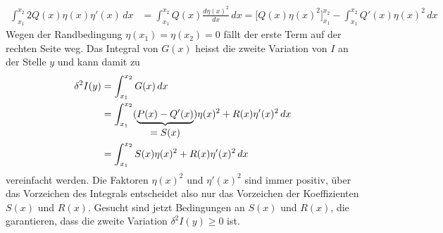 \begin{align*}
\int_{x_1}^{x_2}
2Q(x)\eta(x)\eta'(x)
\,dx
&=
\int_{x_1}^{x_2}
Q(x) \frac{d\eta(x)^2}{dx}
\,dx
=
\biggl[Q(x)\eta(x)^2\biggr]_{x_1}^{x_2}
-
\int_{x_1}^{x_2} Q'(x) \eta(x)^2\,dx
\end{align*}
Wegen der Randbedingung $\eta(x_1)=\eta(x_2)=0$ fällt der
erste Term auf der rechten Seite weg.
Das Integral von $G(x)$ heisst die zweite Variation von $I$ an der
Stelle $y$ und kann damit zu
\begin{align}
\delta^2 I(y)
&=
\int_{x_1}^{x_2} G(x)\,dx
\notag
\\
&=
\int_{x_1}^{x_2}
(\underbrace{P(x)-Q'(x)}_{\displaystyle = S(x)}) \eta(x)^2
+
R(x)\eta'(x)^2
\,dx
\notag
\\
&=
\int_{x_1}^{x_2}
S(x)\eta(x)^2 + R(x)\eta'(x)^2
\,dx
\label{buch:variation2:zweitevariation:eqn:SRintegral}
\end{align}
vereinfacht werden.
Die Faktoren $\eta(x)^2$ und $\eta'(x)^2$ sind immer positiv,
über das Vorzeichen des Integrals entscheidet also nur das Vorzeichen
der Koeffizienten $S(x)$ und $R(x)$.
Gesucht sind jetzt Bedingungen an $S(x)$ und $R(x)$, die garantieren,
dass die zweite Variation $\delta^2 I(y)\ge 0$ ist.


